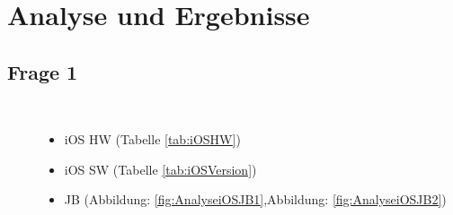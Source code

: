 %
%
%
% 


\chapter{Analyse und Ergebnisse}
\label{ch:Ergebnisse}

\section{Frage 1}
\label{sec:Frage1}

\begin{description}
    \item[\parbox{\textwidth} {Antwort kurz INFO Katharina}]~\par
    \begin{itemize}
          \item iOS HW (Tabelle \ref{tab:iOSHW})
           \item iOS SW (Tabelle \ref{tab:iOSVersion})
           \item JB  (Abbildung: \ref{fig:AnalyseiOSJB1},Abbildung: \ref{fig:AnalyseiOSJB2})
    \end{itemize}
\end{description} 

